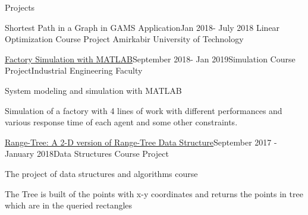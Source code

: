 \documentclass{resume} %
\begin{document}
\begin{rSection}{Projects}
\begin{rSubsection}{Shortest Path in a Graph in GAMS Application}{Jan 2018- July 2018}{
				Linear Optimization Course Project }{Amirkabir University of Technology}
		\end{rSubsection}
		
		\begin{rSubsection}{\href{https://github.com/pouyaaghahoseini/System-Queueing-Simulation}{Factory Simulation with MATLAB}}{September 2018- Jan 2019}{Simulation Course Project}{Industrial Engineering Faculty}
			\item System modeling and simulation with MATLAB
			\item Simulation of a factory with 4 lines of work with different performances and various response time of each agent and some other constraints.
			
			
		\end{rSubsection}
		
		\begin{rSubsection}{\href{https://github.com/pouyaaghahoseini/DS-Course}{Range-Tree: A 2-D version of Range-Tree Data Structure}}{September 2017 - January 2018}{Data Structures Course Project}{ }
			\item The project of data structures and algorithms course
			\item The Tree is built of the points with x-y coordinates and returns the points in tree which are in the queried rectangles
			
		\end{rSubsection}
		
		
		
	\end{rSection}
\end{document}
